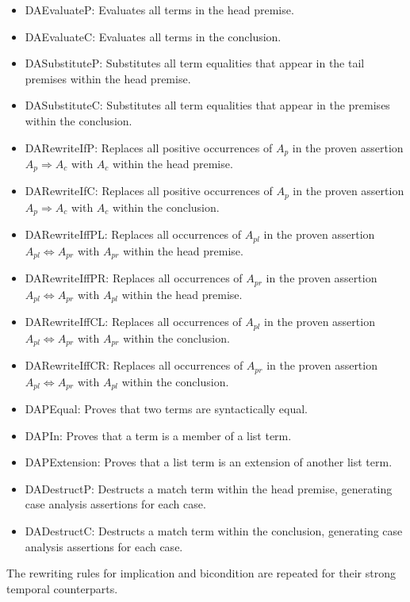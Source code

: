 \documentclass[12pt]{article}
\def\Aif{\Rightarrow}
\def\Aiff{\Leftrightarrow}
\begin{document}
\begin{itemize}

  \item DAEvaluateP: Evaluates all terms in the head premise.
  \item DAEvaluateC: Evaluates all terms in the conclusion.
  \item DASubstituteP: Substitutes all term equalities that appear in
    the tail premises within the head premise.
  \item DASubstituteC: Substitutes all term equalities that appear in
    the premises within the conclusion.
  \item DARewriteIfP: Replaces all positive occurrences of $A_p$ in the
    proven assertion $A_p \Aif A_c$ with $A_c$ within the head premise.
  \item DARewriteIfC: Replaces all positive occurrences of $A_p$ in the
    proven assertion $A_p \Aif A_c$ with $A_c$ within the conclusion.
  \item DARewriteIffPL: Replaces all occurrences of $A_{pl}$ in the
    proven assertion $A_{pl} \Aiff A_{pr}$ with $A_{pr}$ within the head
    premise.
  \item DARewriteIffPR: Replaces all occurrences of $A_{pr}$ in the
    proven assertion $A_{pl} \Aiff A_{pr}$ with $A_{pl}$ within the head
    premise.
  \item DARewriteIffCL: Replaces all occurrences of $A_{pl}$ in the
    proven assertion $A_{pl} \Aiff A_{pr}$ with $A_{pr}$ within the
    conclusion.
  \item DARewriteIffCR: Replaces all occurrences of $A_{pr}$ in the
    proven assertion $A_{pl} \Aiff A_{pr}$ with $A_{pl}$ within the
    conclusion.
  \item DAPEqual: Proves that two terms are syntactically equal.
  \item DAPIn: Proves that a term is a member of a list term.
  \item DAPExtension: Proves that a list term is an extension of another
    list term.
  \item DADestructP: Destructs a match term within the head premise,
    generating case analysis assertions for each case.
  \item DADestructC: Destructs a match term within the conclusion,
    generating case analysis assertions for each case.

\end{itemize}

The rewriting rules for implication and bicondition are repeated for
their strong temporal counterparts.
\end{document}
